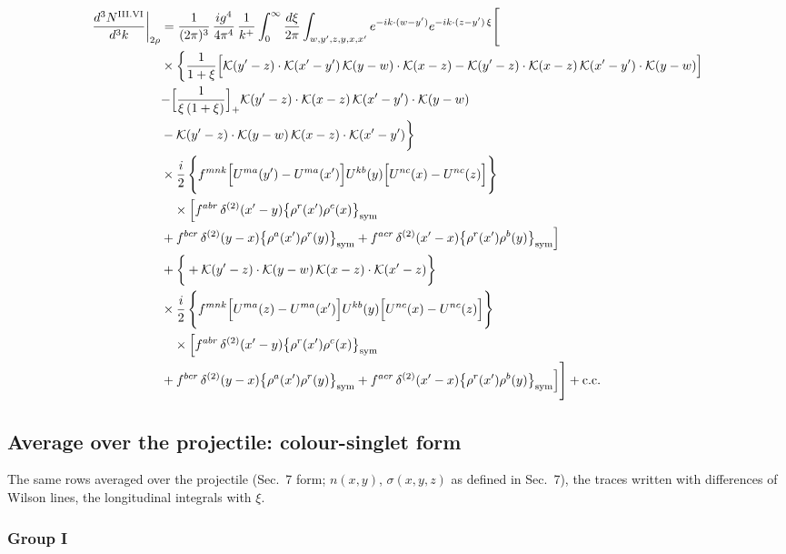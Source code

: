 \documentclass[9pt]{article}
\numberwithin{equation}{section}
\begin{document}
\begin{align}
\frac{d^{3}N^{\rm III.VI}}{d^{3}k}\bigg|_{2\rho}&=\frac{1}{(2\pi)^{3}}\,\frac{ig^{4}}{4\pi^{4}}\,\frac{1}{k^{+}}\int_{0}^{\infty}\frac{d\xi}{2\pi}\int_{w,y',z,y,x,x'}e^{-ik\cdot(w-y')}e^{-ik\cdot(z-y')\,\xi}\Bigg[\notag\\
&\times\bigg\{\frac{1}{1+\xi}\Big[\mathcal{K}(y'-z)\cdot\mathcal{K}(x'-y')\,\mathcal{K}(y-w)\cdot\mathcal{K}(x-z)-\mathcal{K}(y'-z)\cdot\mathcal{K}(x-z)\,\mathcal{K}(x'-y')\cdot\mathcal{K}(y-w)\Big]\notag\\
&{-\Big[\frac{1}{\xi\,(1+\xi)}\Big]_{+}\mathcal{K}(y'-z)\cdot\mathcal{K}(x-z)\,\mathcal{K}(x'-y')\cdot\mathcal{K}(y-w)}\notag\\
&-\mathcal{K}(y'-z)\cdot\mathcal{K}(y-w)\,\mathcal{K}(x-z)\cdot\mathcal{K}(x'-y')\bigg\}\notag\\
&\times \frac{i}{2}\,\Bigg\{f^{mnk}\Big[U^{ma}(y')-U^{ma}(x')\Big]U^{kb}(y)\Big[U^{nc}(x)-U^{nc}(z)\Big]\Bigg\}\notag\\&\quad\times\Big[f^{abr}\,\delta^{(2)}(x'-y)\big\{\rho^{r}(x')\rho^{c}(x)\big\}_{\rm sym}\notag\\
& +f^{bcr}\,\delta^{(2)}(y-x)\big\{\rho^{a}(x')\rho^{r}(y)\big\}_{\rm sym} +f^{acr}\,\delta^{(2)}(x'-x)\big\{\rho^{r}(x')\rho^{b}(y)\big\}_{\rm sym}\Big]\notag\\
&+\bigg\{+\mathcal{K}(y'-z)\cdot\mathcal{K}(y-w)\,\mathcal{K}(x-z)\cdot\mathcal{K}(x'-z)\bigg\}\notag\\
&\times \frac{i}{2}\,\Bigg\{f^{mnk}\Big[U^{ma}(z)-U^{ma}(x')\Big]U^{kb}(y)\Big[U^{nc}(x)-U^{nc}(z)\Big]\Bigg\}\notag\\&\quad\times\Big[f^{abr}\,\delta^{(2)}(x'-y)\big\{\rho^{r}(x')\rho^{c}(x)\big\}_{\rm sym}\notag\\
& +f^{bcr}\,\delta^{(2)}(y-x)\big\{\rho^{a}(x')\rho^{r}(y)\big\}_{\rm sym} +f^{acr}\,\delta^{(2)}(x'-x)\big\{\rho^{r}(x')\rho^{b}(y)\big\}_{\rm sym}\Big]\Bigg]+{\rm c.c.}\label{eq:H-III.VI-2}
\end{align}

\subsection{Average over the projectile: colour-singlet form}\label{sec:F2}
\noindent The same rows averaged over the projectile (Sec.~7 form; $n(x,y)$, $\sigma(x,y,z)$ as defined in Sec.~7), the traces written with differences of Wilson lines, the longitudinal integrals with $\xi$.
\subsubsection{Group I}
\end{document}
